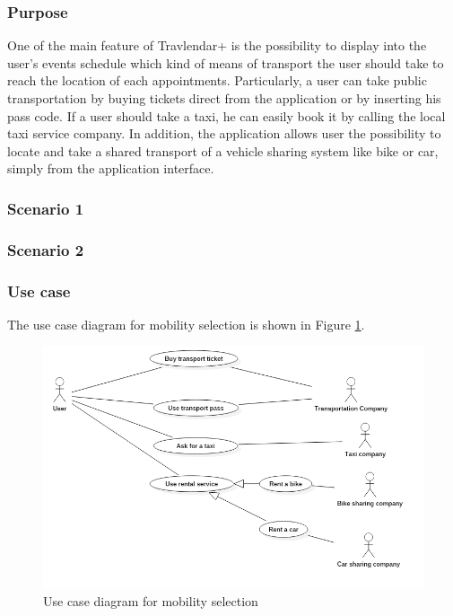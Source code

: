 \subsubsection{Purpose}
One of the main feature of Travlendar+ is the possibility to display into the user's events schedule which kind of means of transport the user should take to reach the location of each appointments. Particularly, a user can take public transportation by buying tickets direct from the application or by inserting his pass code. If a user should take a taxi, he can easily book it by calling the local taxi service company. 
In addition, the application allows user the possibility to locate and take a shared transport of a vehicle sharing system like bike or car, simply from the application interface.

\subsubsection{Scenario 1}
\subsubsection{Scenario 2}
\subsubsection{Use case}
The use case diagram for mobility selection is shown in Figure \ref{fig:useCaseMobility}.
\begin{figure}
	\centering
	\includegraphics[width=6in]{./diagrams/TransportationUseCase.png}
	\caption{Use case diagram for mobility selection}
	\label{fig:useCaseMobility}
\end{figure}

